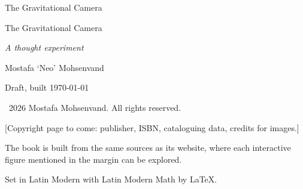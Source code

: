 \pagestyle{empty}
\vspace*{52mm}
{\centering\fontsize{17}{21}\selectfont The Gravitational Camera\par}
\cleardoublepage
\vspace*{36mm}
{\centering
 {\fontsize{30}{36}\selectfont The Gravitational Camera\par}
 \vspace{7mm}
 {\large\itshape A thought experiment\par}
 \vspace{38mm}
 {\large Mostafa \textquoteleft Neo\textquoteright{} Mohsenvand\par}
 \vfill
 {\small Draft, built \today\par}
}
\newpage
\vspace*{\fill}
{\footnotesize\RaggedRight\setlength\parskip{1ex}
 \textcopyright\ 2026 Mostafa Mohsenvand. All rights reserved.

 [Copyright page to come: publisher, ISBN, cataloguing data, credits for images.]

 The book is built from the same sources as its website, where each interactive figure mentioned in the margin
 can be explored.

 Set in Latin Modern with Latin Modern Math by \LaTeX.\par}
\cleardoublepage
\pagestyle{gc}
